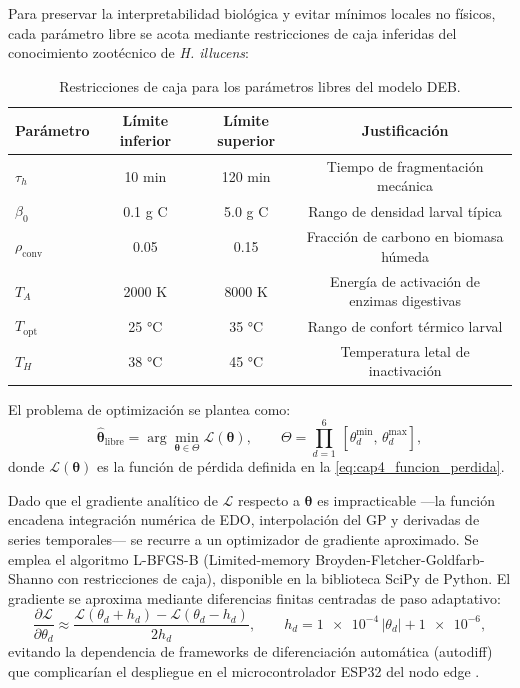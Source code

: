 Para preservar la interpretabilidad biológica y evitar mínimos locales no físicos, cada parámetro libre se acota mediante restricciones de caja inferidas del conocimiento zootécnico de \textit{H. illucens}:

\begin{table}[htbp]
    \centering
    \caption{Restricciones de caja para los parámetros libres del modelo DEB.}
    \label{tab:cap4_restricciones_caja}
    \begin{tabular}{@{}lccc@{}}
        \toprule
        \textbf{Parámetro} & \textbf{Límite inferior} & \textbf{Límite superior} & \textbf{Justificación} \\
        \midrule
        $\tau_h$ & \num{10} min & \num{120} min & Tiempo de fragmentación mecánica \\
        $\beta_0$ & \num{0.1} g C & \num{5.0} g C & Rango de densidad larval típica \\
        $\rho_{\mathrm{conv}}$ & \num{0.05} & \num{0.15} & Fracción de carbono en biomasa húmeda \\
        $T_A$ & \num{2000} K & \num{8000} K & Energía de activación de enzimas digestivas \\
        $T_{\mathrm{opt}}$ & \num{25} °C & \num{35} °C & Rango de confort térmico larval \\
        $T_H$ & \num{38} °C & \num{45} °C & Temperatura letal de inactivación \\
        \bottomrule
    \end{tabular}
\end{table}

El problema de optimización se plantea como:
\begin{equation}
    \label{eq:cap4_optimizacion}
    \hat{\boldsymbol{\theta}}_{\mathrm{libre}} =
    \arg\min_{\boldsymbol{\theta} \in \Theta}
    \mathcal{L}(\boldsymbol{\theta}),
    \qquad
    \Theta = \prod_{d=1}^{6}\,[\theta_d^{\min},\, \theta_d^{\max}],
\end{equation}
donde $\mathcal{L}(\boldsymbol{\theta})$ es la función de pérdida definida en la \cref{eq:cap4_funcion_perdida}.

Dado que el gradiente analítico de $\mathcal{L}$ respecto a $\boldsymbol{\theta}$ es impracticable —la función encadena integración numérica de EDO, interpolación del GP y derivadas de series temporales— se recurre a un optimizador de gradiente aproximado. Se emplea el algoritmo L-BFGS-B (Limited-memory Broyden-Fletcher-Goldfarb-Shanno con restricciones de caja), disponible en la biblioteca SciPy de Python. El gradiente se aproxima mediante diferencias finitas centradas de paso adaptativo:
\begin{equation}
    \label{eq:cap4_gradiente_df}
    \frac{\partial \mathcal{L}}{\partial \theta_d} \approx
    \frac{\mathcal{L}(\theta_d + h_d) - \mathcal{L}(\theta_d - h_d)}{2h_d},
    \qquad
    h_d = \num{1e-4}\,|\theta_d| + \num{1e-6},
\end{equation}
evitando la dependencia de frameworks de diferenciación automática (autodiff) que complicarían el despliegue en el microcontrolador ESP32 del nodo edge \parencite{weichertReviewMachineLearning2019}.

